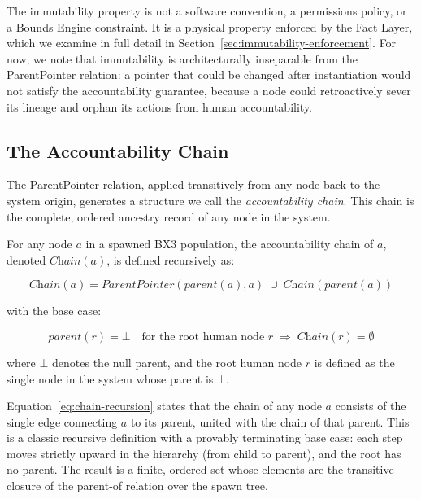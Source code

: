 The immutability property is not a software convention, a permissions policy, or a Bounds Engine constraint. It is a physical property enforced by the Fact Layer, which we examine in full detail in Section~\ref{sec:immutability-enforcement}. For now, we note that immutability is architecturally inseparable from the ParentPointer relation: a pointer that could be changed after instantiation would not satisfy the accountability guarantee, because a node could retroactively sever its lineage and orphan its actions from human accountability.

\subsection{The Accountability Chain}

The ParentPointer relation, applied transitively from any node back to the system origin, generates a structure we call the \textit{accountability chain}. This chain is the complete, ordered ancestry record of any node in the system.

\begin{definition}
\label{def:chain}
For any node $a$ in a spawned BX3 population, the accountability chain of $a$, denoted $\textit{Chain}(a)$, is defined recursively as:

\begin{equation}
\label{eq:chain-recursion}
\textit{Chain}(a) = \textit{ParentPointer}(\textit{parent}(a), a) \;\cup\; \textit{Chain}(\textit{parent}(a))
\end{equation}

\noindent with the base case:

\begin{equation}
\label{eq:chain-base}
\textit{parent}(r) = \bot \quad\text{for the root human node } r \;\Rightarrow\; \textit{Chain}(r) = \emptyset
\end{equation}

\noindent where $\bot$ denotes the null parent, and the root human node $r$ is defined as the single node in the system whose parent is $\bot$.
\end{definition}

Equation~\ref{eq:chain-recursion} states that the chain of any node $a$ consists of the single edge connecting $a$ to its parent, united with the chain of that parent. This is a classic recursive definition with a provably terminating base case: each step moves strictly upward in the hierarchy (from child to parent), and the root has no parent. The result is a finite, ordered set whose elements are the transitive closure of the parent-of relation over the spawn tree.

